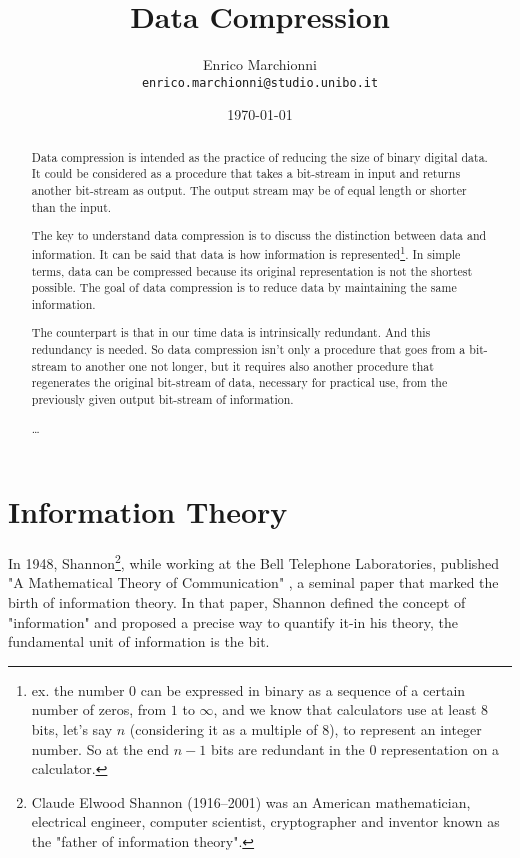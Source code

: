 \documentclass[12pt, a4paper]{report}
\title{
  Data Compression
}
\author{
  Enrico Marchionni\\
  \texttt{enrico.marchionni@studio.unibo.it}
}
\date{\today}
\begin{document}
\maketitle

\begin{abstract}

Data compression is intended as the practice of reducing the size of binary digital data.
It could be considered as a procedure that takes a bit-stream in input and returns another bit-stream as output.
The output stream may be of equal length or shorter than the input.

The key to understand data compression is to discuss the distinction between data and information.
It can be said that data is how information is represented\footnote{ex. the number 0 can be expressed in binary as a sequence of a
certain number of zeros, from \(1\) to \(\infty\), and we know that calculators use at least 8 bits, let's say \(n\)
(considering it as a multiple of 8), to represent an integer number. So at the end \(n - 1\) bits are redundant in the 0
representation on a calculator.}. In simple terms, data can be compressed because its original representation is not the shortest
possible. The goal of data compression is to reduce data by maintaining the same information.

The counterpart is that in our time data is intrinsically redundant. And this redundancy is needed.
So data compression isn't only a procedure that goes from a bit-stream to another one not longer, but it requires also another
procedure that regenerates the original bit-stream of data, necessary for practical use, from the previously given output
bit-stream of information.

\dots %

\end{abstract}

\tableofcontents

\chapter{Information Theory}

In 1948, Shannon\footnote{Claude Elwood Shannon (1916–2001) was an American mathematician, electrical engineer, computer
scientist, cryptographer and inventor known as the "father of information theory".}, while working at the Bell Telephone
Laboratories, published "A Mathematical Theory of Communication" \cite{AMathematicalTheoryOfCommunication}, a seminal paper that
marked the birth of information theory. In that paper, Shannon defined the concept of "information" and proposed a precise way to
quantify it-in his theory, the fundamental unit of information is the bit.
\end{document}

